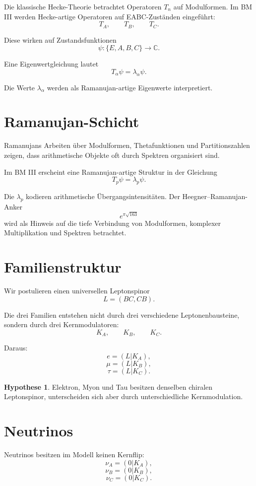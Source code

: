 \documentclass[11pt,a4paper]{article}
\theoremstyle{definition}
\newtheorem{hypothese}[satz]{Hypothese}
\begin{document}
	Die klassische Hecke-Theorie betrachtet Operatoren \(T_n\) auf Modulformen. Im BM III werden Hecke-artige Operatoren auf EABC-Zuständen eingeführt:
	\[
	T_A,\qquad T_B,\qquad T_C.
	\]
	
	Diese wirken auf Zustandsfunktionen
	\[
	\psi:\{E,A,B,C\}\to\mathbb C.
	\]
	
	Eine Eigenwertgleichung lautet
	\[
	T_\alpha\psi=\lambda_\alpha\psi.
	\]
	
	Die Werte \(\lambda_\alpha\) werden als Ramanujan-artige Eigenwerte interpretiert.
	
	\section{Ramanujan-Schicht}
	
	Ramanujans Arbeiten über Modulformen, Thetafunktionen und Partitionszahlen zeigen, dass arithmetische Objekte oft durch Spektren organisiert sind.
	
	Im BM III erscheint eine Ramanujan-artige Struktur in der Gleichung
	\[
	T_p\psi=\lambda_p\psi.
	\]
	
	Die \(\lambda_p\) kodieren arithmetische Übergangsintensitäten. Der Heegner--Ramanujan-Anker
	\[
	e^{\pi\sqrt{163}}
	\]
	wird als Hinweis auf die tiefe Verbindung von Modulformen, komplexer Multiplikation und Spektren betrachtet.
	
	\section{Familienstruktur}
	
	Wir postulieren einen universellen Leptonspinor
	\[
	L=(BC,CB).
	\]
	
	Die drei Familien entstehen nicht durch drei verschiedene Leptonenbausteine, sondern durch drei Kernmodulatoren:
	\[
	K_A,\qquad K_B,\qquad K_C.
	\]
	
	Daraus:
	\[
	e=(L|K_A),
	\]
	\[
	\mu=(L|K_B),
	\]
	\[
	\tau=(L|K_C).
	\]
	
	\begin{hypothese}
		Elektron, Myon und Tau besitzen denselben chiralen Leptonspinor, unterscheiden sich aber durch unterschiedliche Kernmodulation.
	\end{hypothese}
	
	\section{Neutrinos}
	
	Neutrinos besitzen im Modell keinen Kernflip:
	\[
	\nu_A=(0|K_A),
	\]
	\[
	\nu_B=(0|K_B),
	\]
	\[
	\nu_C=(0|K_C).
	\]
	
\end{document}
